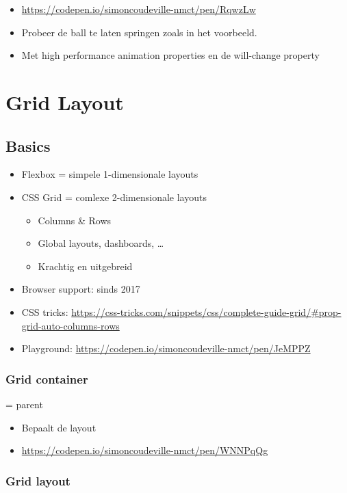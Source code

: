 \documentclass{article}
\begin{document}
\begin{itemize}
    \item \url{https://codepen.io/simoncoudeville-nmct/pen/RqwzLw}
    \item Probeer de ball te laten springen zoals in het voorbeeld.
    \item Met high performance animation properties en de will-change property
\end{itemize}

\section{Grid Layout}

\subsection{Basics}

\begin{itemize}
    \item Flexbox = simpele 1-dimensionale layouts
    \item CSS Grid = comlexe 2-dimensionale layouts
    \begin{itemize}
        \item Columns \& Rows
        \item Global layouts, dashboards, \dots
        \item Krachtig en uitgebreid
    \end{itemize}
    \item Browser support: sinds 2017
    \item CSS tricks: \url{https://css-tricks.com/snippets/css/complete-guide-grid/#prop-grid-auto-columns-rows}
    \item Playground: \url{https://codepen.io/simoncoudeville-nmct/pen/JeMPPZ}
\end{itemize}

\subsubsection{Grid container}

= parent

\begin{itemize}
    \item Bepaalt de layout
    \item \url{https://codepen.io/simoncoudeville-nmct/pen/WNNPqQg}
\end{itemize}

\subsubsection{Grid layout}
\end{document}
